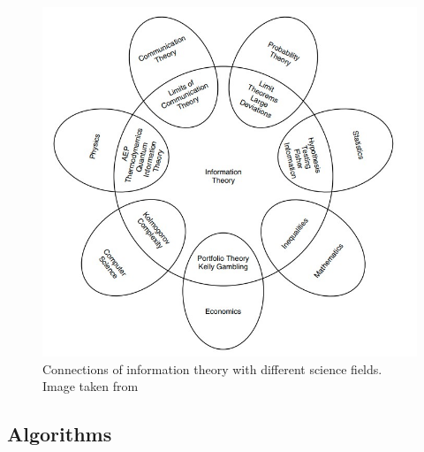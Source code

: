 \documentclass[12pt,%
               a4paper,%
               oneside,openany,%
               titlepage,%
               headinclude,footinclude,%
               BCOR5mm,%
               cleardoublepage=empty,%
               tablecaptionabove,%
               floatperchapter,
               ]{scrreprt}                 %
\begin{document}
\begin{figure}
\begin{center}
\includegraphics[width=\textwidth]{Figures/Information_theory_connections.jpg}
\caption{Connections of information theory with different science fields. Image taken from \cite{cover2006elements}}
\label{Information_theory_connections}
\end{center}
\end{figure}

\subsection{Algorithms}
\end{document}
